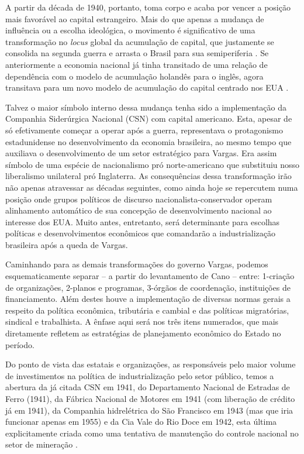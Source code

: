 A partir da década de 1940, portanto, toma corpo e acaba por vencer a
posição mais favorável ao capital estrangeiro. Mais do que
apenas a mudança de influência ou a escolha ideológica, o movimento é
significativo de uma transformação no \emph{locus} global da acumulação
de capital, que justamente se consolida na segunda guerra e arrasta o
Brasil para sua semiperiferia \citep{wallerstein2001,arrighiseculoxx}. Se anteriormente
a economia nacional já tinha transitado de uma relação de dependência
com o modelo de acumulação holandês para o inglês, agora transitava para
um novo modelo de acumulação do capital centrado nos EUA \citep{arrighiseculoxx}.

Talvez o maior símbolo interno dessa mudança tenha sido a implementação
da Companhia Siderúrgica Nacional (CSN) com capital americano.  Esta,
apesar de só efetivamente começar a operar após a guerra, representava o
protagonismo estadunidense no desenvolvimento da economia brasileira, ao
mesmo tempo que auxiliava o desenvolvimento de um setor estratégico para
Vargas. Era assim símbolo de uma espécie de nacionalismo pró
norte-americano que substituiu nosso liberalismo unilateral pró
Inglaterra. As consequências dessa transformação irão não apenas
atravessar as décadas seguintes, como ainda hoje se repercutem numa
posição onde grupos políticos de discurso nacionalista-conservador
operam alinhamento automático de sua concepção de desenvolvimento
nacional ao interesse dos EUA. Muito antes, entretanto, será
determinante para escolhas políticas e desenvolvimentos econômicos que
comandarão a industrialização brasileira após a queda de Vargas.

Caminhando para as demais transformações do governo Vargas, podemos
esquematicamente separar -- a partir do levantamento de Cano \citeyearpar[]{canocintra1974}
 -- entre: 1-criação de organizações, 2-planos e programas,
3-órgãos de coordenação, instituições de financiamento. Além destes
houve a implementação de diversas normas gerais a respeito da política
econômica, tributária e cambial e das políticas migratórias, sindical e
trabalhista. A ênfase aqui será nos três itens numerados, que mais diretamente
refletem as estratégias de planejamento econômico do Estado no período.

Do ponto de vista das estatais e organizações, as responsáveis pelo maior volume de investimentos 
na política de industrialização pelo setor
público, temos a abertura da já citada CSN em
1941, do Departamento Nacional de Estradas de Ferro (1941), da Fábrica
Nacional de Motores em 1941 (com liberação de crédito já em 1941), da
Companhia hidrelétrica do São Francisco em 1943 (mas que iria funcionar
apenas em 1955) e da Cia Vale do Rio Doce em 1942, esta última
explicitamente criada como uma tentativa de manutenção do controle
nacional no setor de mineração \citep{canocintra1974}.

